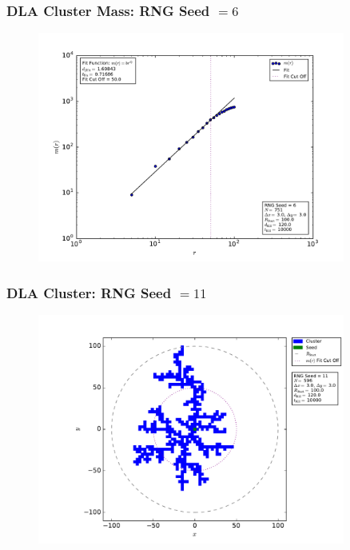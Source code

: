 \documentclass[mathserif,18pt,xcolor=table]{beamer}
\begin{document}
\begin{frame}
  \frametitle{DLA Cluster Mass: RNG Seed $= 6$}
\begin{figure}
  \centering
  \includegraphics[width=0.9\textwidth]{problem_3/large_cluster_mass_seed_num_6.pdf}
\end{figure}
\end{frame}

\begin{frame}
  \frametitle{DLA Cluster: RNG Seed $= 11$}
\begin{figure}
  \centering
  \includegraphics[width=0.9\textwidth]{problem_3/large_cluster_seed_num_11.pdf}
\end{figure}
\end{frame}
\end{document}
